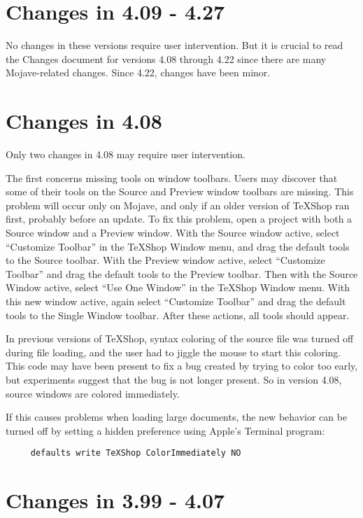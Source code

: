 \documentclass[11pt, oneside]{amsart}
\begin{document}
\section{Changes in 4.09 - 4.27}

No changes in these versions require user intervention. But it is crucial to read the Changes document for versions 4.08 through 4.22 since there are many Mojave-related changes. Since 4.22, changes have been minor.

\section{Changes in 4.08}

Only two changes in 4.08 may require user intervention.

The first concerns missing tools on window toolbars. Users may discover that some of their tools on the Source and Preview window toolbars are missing. This problem will occur only on Mojave, and only if an older version of TeXShop ran first, probably before an update. To fix this problem, open a project with both a Source window and a Preview window. With the Source window active, select ``Customize Toolbar'' in the TeXShop Window menu, and drag the default tools to the Source toolbar. With the Preview window active, select ``Customize Toolbar'' and drag the default tools to the Preview toolbar. Then with the Source Window active, select ``Use One Window'' in the TeXShop Window menu. With this new window active, again select ``Customize Toolbar'' and drag the default tools to the Single Window toolbar. After these actions, all tools should appear.

In previous versions of TeXShop, syntax coloring of the source file was turned off during file loading, and the user had to jiggle the mouse to start this coloring. This code may have been present to fix a bug created by trying to color too early, but experiments suggest that the bug is not longer present. So in version 4.08, source windows are colored immediately.

If this causes problems when loading large documents, the new behavior can be turned off by setting a hidden preference using Apple's Terminal program:
\begin{verbatim}
     defaults write TeXShop ColorImmediately NO
\end{verbatim}




\section{Changes in 3.99 - 4.07}
\end{document}
